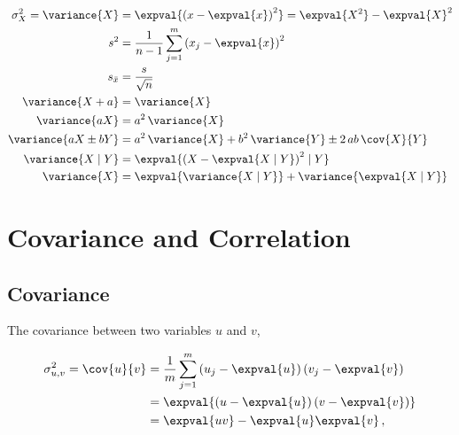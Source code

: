 \begin{subequations}\label{eq:stats:var_relations}
\begin{align}
\sigma_{X}^{2} = \variance{X} &= \expval{\left(x-\expval{x}\right)^{2}} = \expval{X^{2}} - \expval{X}^{2} \label{eq:stats:var_relations:def} \\
s^{2} &= \frac{1}{n-1} \sum_{j=1}^{m} \left( x_{j} - \expval{x}\right)^{2} \label{eq:stats:var_relations:sample} \\
s_{\bar{x}} &= \frac{s}{\sqrt{n}} \label{eq:stats:var_relations:standard_error_of_mean} \\
\variance{X+a} &= \variance{X} \label{eq:stats:var_relations:add} \\
\variance{a X} &= a^{2} \, \variance{X} \label{eq:stats:var_relations:mult} \\
\variance{a X \pm b Y} &= a^{2} \, \variance{X} + b^{2} \, \variance{Y} \pm 2 \, ab \, \cov{X}{Y} \label{eq:stats:var_relations:linear} \\
\variance{X \mid Y} &= \expval{\left(X - \expval{X \mid Y}\right)^{2} \mid Y} \label{eq:stats:var_relations:conditional1} \\
\variance{X} &= \expval{\variance{X \mid Y}} + \variance{\expval{X \mid Y}} \label{eq:stats:var_relations:conditional2}
\end{align}
\end{subequations}

\section{Covariance and Correlation}
\label{stats:corr_covar}

\subsection{Covariance}
\label{stats:corr_covar:covariance}

The covariance between two variables $u$ and $v$,

\begin{equation}\label{eq:stats:covar}
\begin{split}
\sigma_{u,v}^{2} = \cov{u}{v} &= \frac{1}{m}\sum_{j=1}^{m}\left(u_{j}-\expval{u}\right)\left(v_{j}-\expval{v}\right) \\
&= \expval{\left(u-\expval{u}\right)\left(v-\expval{v}\right)} \\
&= \expval{u v} - \expval{u}\expval{v}\,,
\end{split}
\end{equation}

